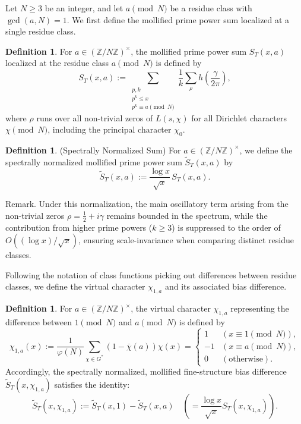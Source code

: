\documentclass[12pt,reqno]{amsart}
\theoremstyle{definition}
\newtheorem{definition}[theorem]{Definition}
\theoremstyle{remark}
\numberwithin{equation}{section}
\begin{document}
Let $N \ge 3$ be an integer, and let $a \pmod N$ be a residue class with $\gcd(a, N) = 1$. We first define the mollified prime power sum localized at a single residue class.

\begin{definition}\label{def:S_T_a}
For $a \in (\mathbb{Z}/N\mathbb{Z})^\times$, the mollified prime power sum $S_T(x, a)$ localized at the residue class $a \pmod N$ is defined by
\begin{equation}
S_T(x, a) := \sum_{\substack{p, k \\ p^k \le x \\ p^k \equiv a \pmod N}} \frac{1}{k} \sum_{\rho} h\left(\frac{\gamma}{2\pi}\right),
\end{equation}
where $\rho$ runs over all non-trivial zeros of $L(s, \chi)$ for all Dirichlet characters $\chi \pmod N$, including the principal character $\chi_0$.
\end{definition}

\begin{definition}\label{def:S_T_a} (Spectrally Normalized Sum)
For $a \in (\mathbb{Z}/N\mathbb{Z})^\times$, we define the spectrally normalized mollified prime power sum 
$\widetilde{S}_T(x,a)$ by%
\[
\widetilde{S}_T(x,a) := \frac{\log x}{\sqrt{x} } \, S_T(x,a).
\]
\end{definition}

Remark. Under this normalization, the main oscillatory term arising from the non-trivial zeros $\rho = \frac{1}{2} + i\gamma$ remains bounded in the spectrum, while the contribution from higher prime powers ($k \ge 3$) is suppressed to the order of $O((\log x)/\sqrt x)$, ensuring scale-invariance when comparing distinct residue classes.

Following the notation of class functions picking out differences between residue classes, we define the virtual character $\chi_{1,a}$ and its associated bias difference.

\begin{definition}\label{def:chi_1a}
For $a \in (\mathbb{Z}/N\mathbb{Z})^\times$, the virtual character $\chi_{1,a}$ representing the difference between $1 \pmod N$ and $a \pmod N$ is defined by
\begin{equation}
\chi_{1,a}(x) := \frac{1}{\varphi(N)} \sum_{\chi \in G^*} (1 - \overline{\chi}(a)) \chi(x) = \begin{cases} 1 & (x \equiv 1 \pmod N), \\ -1 & (x \equiv a \pmod N), \\ 0 & (\text{otherwise}). \end{cases}
\end{equation}
Accordingly, the spectrally normalized, mollified fine-structure bias difference $\widetilde S_T(x, \chi_{1,a})$ satisfies the identity:
\begin{equation}
\widetilde{S}_T(x, \chi_{1,a}) := \widetilde{S}_T(x, 1) - \widetilde{S}_T(x, a) \quad \left( = \frac{\log x}{\sqrt{x}} S_T(x, \chi_{1,a}) \right).
\end{equation}
\end{definition}
\end{document}
